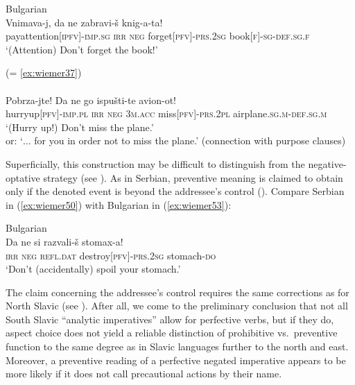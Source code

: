 \documentclass[output=paper,colorlinks,citecolor=brown]{langscibook}
\begin{document}
\ea \textnormal{Bulgarian}\\
\label{ex:wiemer51} 
\gll {\op}Vnimava-j,{\cp} da ne zabravi-š knig-a-ta!\\
pay\textunderscore attention\textsc{[ipfv]-imp.sg} \textsc{irr} \textsc{neg} forget\textsc{[pfv]-prs.2sg} book\textsc{[f]-sg-def.sg.f}\\
\glt `(Attention) Don't forget the book!'
\z

\ea 
\label{ex:wiemer52} \textnormal{(= \ref{ex:wiemer37})} \\
 \\
 \gll {\op}Pobrza-jte!{\cp} Da ne go ispušti-te avion-ot! \\
hurry\textunderscore up\textsc{[pfv]-imp.pl} \textsc{irr} \textsc{neg} \textsc{3m.acc} miss\textsc{[pfv]-prs.2pl} airplane\textsc{.sg.m-def.sg.m} \\
\glt `(Hurry up!) Don't miss the plane.' \\
or: `$\ldots$ for you in order not to miss the plane.' (connection with purpose clauses) \\
\z

\noindent Superficially, this construction may be difficult to distinguish from the negative-optative strategy (see ). As in Serbian, preventive meaning is claimed to obtain only if the denoted event is beyond the addressee's control (\citealt[41]{Cakarova2009}). Compare Serbian in (\ref{ex:wiemer50}) with Bulgarian in (\ref{ex:wiemer53}):

\ea \textnormal{Bulgarian} \\
\label{ex:wiemer53} 
\gll Da ne si razvali-š stomax-a! \\
\textsc{irr} \textsc{neg} \textsc{refl.dat} destroy\textsc{[pfv]-prs.2sg} stomach-\textsc{do} \\
\glt `Don't (accidentally) spoil your stomach.'
\z


\noindent The claim concerning the addressee's control requires the same corrections as for North Slavic (see ). After all, we come to the preliminary conclusion that not all South Slavic ``analytic imperatives'' allow for perfective verbs, but if they do, aspect choice does not yield a reliable distinction of prohibitive vs.\ preventive function to the same degree as in Slavic languages further to the north and east. Moreover, a preventive reading of a perfective negated imperative appears to be more likely if it does not call precautional actions by their name.
\end{document}
